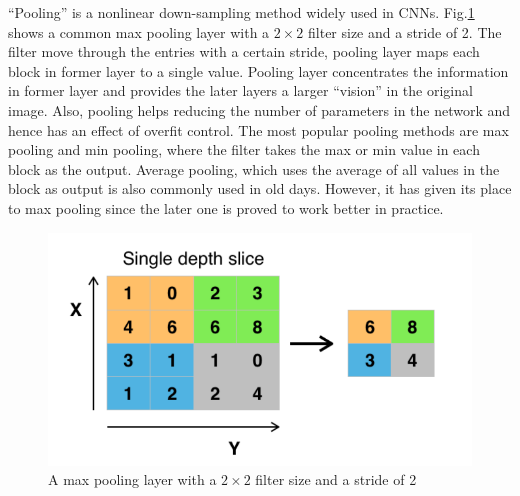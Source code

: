 \enquote{Pooling} is a nonlinear down-sampling method widely used in CNNs. Fig.\ref{fig:pool} shows a common max pooling layer with a $2 \times 2$ filter size and a stride of 2. The filter move through the entries with a certain stride, pooling layer maps each block in former layer to a single value. Pooling layer concentrates the information in former layer and provides the later layers a larger \enquote{vision} in the original image. Also, pooling helps reducing the number of parameters in the network and hence has an effect of overfit control. The most popular pooling methods are max pooling and min pooling, where the filter takes the max or min value in each block as the output. Average pooling, which uses the average of all values in the block as output is also commonly used in old days. However, it has given its place to max pooling since the later one is proved to work better in practice.

\begin{figure}[H]
  \centering
  \includegraphics[width=\linewidth]{figures/pooling.png}
  \caption{A max pooling layer with a $2 \times 2$ filter size and a stride of 2}
  \label{fig:pool}
\end{figure}